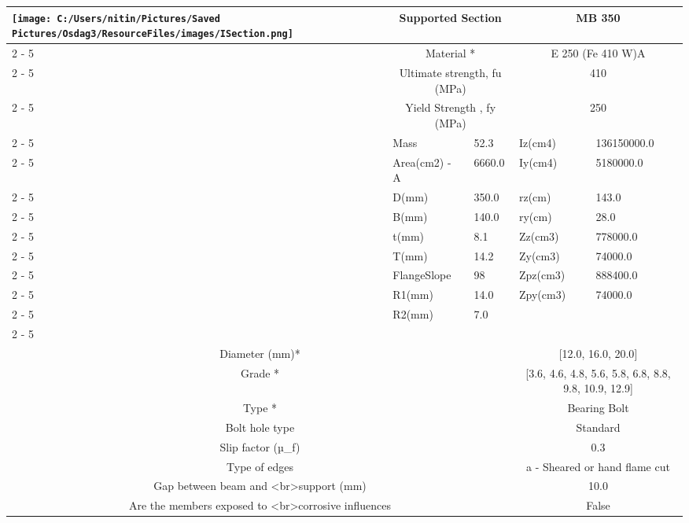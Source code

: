 \documentclass{article}%
\begin{document}
\begin{longtable}{|p{5cm}|p{2cm}|p{2cm}|p{2cm}|p{5cm}|}
\hline%
\hline%
\multirow{13}{*}{\texttt{[image: C:/Users/nitin/Pictures/Saved Pictures/Osdag3/ResourceFiles/images/ISection.png]}}&\multicolumn{2}{|c|}{Supported Section}&\multicolumn{2}{|c|}{MB 350}\\%
\cline{2%
-%
5}%
&\multicolumn{2}{|c|}{Material *}&\multicolumn{2}{|c|}{E 250 (Fe 410 W)A}\\%
\cline{2%
-%
5}%
&\multicolumn{2}{|c|}{Ultimate strength, fu (MPa)}&\multicolumn{2}{|c|}{410}\\%
\cline{2%
-%
5}%
&\multicolumn{2}{|c|}{Yield Strength , fy (MPa)}&\multicolumn{2}{|c|}{250}\\%
\cline{2%
-%
5}%
&Mass&52.3&Iz(cm4)&136150000.0\\%
\cline{2%
-%
5}%
&Area(cm2) {-} A&6660.0&Iy(cm4)&5180000.0\\%
\cline{2%
-%
5}%
&D(mm)&350.0&rz(cm)&143.0\\%
\cline{2%
-%
5}%
&B(mm)&140.0&ry(cm)&28.0\\%
\cline{2%
-%
5}%
&t(mm)&8.1&Zz(cm3)&778000.0\\%
\cline{2%
-%
5}%
&T(mm)&14.2&Zy(cm3)&74000.0\\%
\cline{2%
-%
5}%
&FlangeSlope&98&Zpz(cm3)&888400.0\\%
\cline{2%
-%
5}%
&R1(mm)&14.0&Zpy(cm3)&74000.0\\%
\cline{2%
-%
5}%
&R2(mm)&7.0&&\\%
\cline{2%
-%
5}%
\hline%
\multicolumn{5}{|c|}{\textbf{Bolt Details}}\\%
\hline%
\hline%
\multicolumn{3}{|c|}{Diameter (mm)*}&\multicolumn{2}{|c|}{{[}12.0, 16.0, 20.0{]}}\\%
\hline%
\hline%
\multicolumn{3}{|c|}{Grade *}&\multicolumn{2}{|c|}{{[}3.6, 4.6, 4.8, 5.6, 5.8, 6.8, 8.8, 9.8, 10.9, 12.9{]}}\\%
\hline%
\hline%
\multicolumn{3}{|c|}{Type *}&\multicolumn{2}{|c|}{Bearing Bolt}\\%
\hline%
\hline%
\multicolumn{3}{|c|}{Bolt hole type}&\multicolumn{2}{|c|}{Standard}\\%
\hline%
\hline%
\multicolumn{3}{|c|}{Slip factor (µ\_f)}&\multicolumn{2}{|c|}{0.3}\\%
\hline%
\hline%
\multicolumn{3}{|c|}{Type of edges}&\multicolumn{2}{|c|}{a {-} Sheared or hand flame cut}\\%
\hline%
\hline%
\multicolumn{3}{|c|}{Gap between beam and <br>support (mm)}&\multicolumn{2}{|c|}{10.0}\\%
\hline%
\hline%
\multicolumn{3}{|c|}{Are the members exposed to <br>corrosive influences}&\multicolumn{2}{|c|}{False}\\%

\end{longtable}
\end{document}

